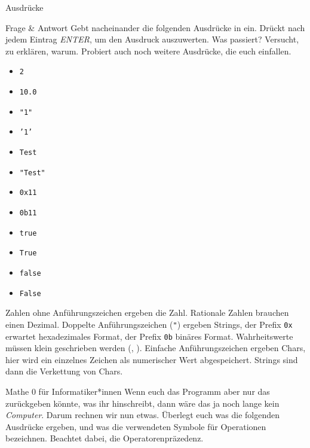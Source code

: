 \begin{task}[points=auto]{Ausdrücke }
    \begin{subtask*}[points=0]{Frage \& Antwort}
        Gebt nacheinander die folgenden Ausdrücke in  ein. Drückt nach
        jedem Eintrag \textit{ENTER}, um den Ausdruck auszuwerten. Was passiert?
        Versucht, zu erklären, warum. Probiert auch noch weitere Ausdrücke, die euch
        einfallen.

        \begin{multicols}{3}
            \begin{itemize}
                \item \texttt{2}
                \item \texttt{10.0}
                \item \texttt{"1"}
                \item \texttt{'1'}
                \item \texttt{Test}
                \item \texttt{"Test"}
                \item \texttt{0x11}
                \item \texttt{0b11}
                \item \texttt{true}
                \item \texttt{True}
                \item \texttt{false}
                \item \texttt{False}
            \end{itemize}
        \end{multicols}


        \begin{solution}
            Zahlen ohne Anführungszeichen ergeben die Zahl. Rationale Zahlen brauchen einen
            Dezimal. Doppelte Anführungszeichen (\texttt{"}) ergeben Strings,
            der Prefix \texttt{0x} erwartet hexadezimales Format, der Prefix \texttt{0b}
            binäres Format. Wahrheitswerte müssen klein geschrieben werden (,
            ).
            Einfache Anführungszeichen ergeben Chars, hier wird ein einzelnes Zeichen als numerischer Wert abgespeichert.
            Strings sind dann die Verkettung von Chars.
        \end{solution}
    \end{subtask*}
    \begin{subtask*}[points=0]{Mathe 0 für Informatiker*innen}
        Wenn euch das Programm aber nur das zurückgeben könnte, was ihr hinschreibt,
        dann wäre das ja noch lange kein \textit{Computer}. Darum rechnen wir nun etwas.
        Überlegt euch was die folgenden Ausdrücke ergeben, und was die verwendeten
        Symbole für Operationen bezeichnen. Beachtet dabei, die Operatorenpräzedenz.


\end{subtask*}
\end{task}

